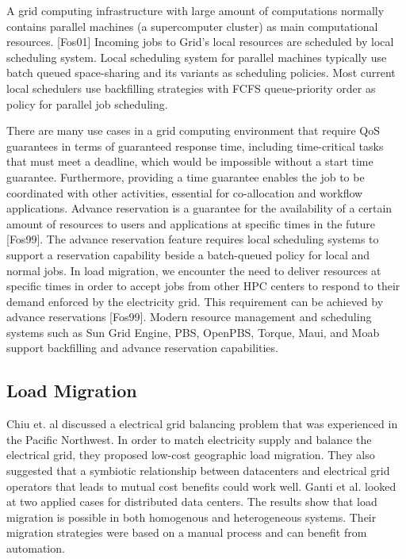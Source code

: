 A grid computing infrastructure with large amount of computations normally
contains parallel machines (a supercomputer cluster) as main computational
resources.  \cite{foster_anatomy_2001} [Fos01]
Incoming jobs to Grid's local resources are scheduled by
local scheduling system. Local scheduling system for parallel machines
typically use batch queued space-sharing and its variants as scheduling
policies. Most current local schedulers use backfilling strategies with FCFS
queue-priority order as policy for parallel job scheduling.

There are many use cases in a grid computing environment that require QoS
guarantees in terms of guaranteed response time, including time-critical
tasks that must meet a deadline, which would be impossible without a start
time guarantee. Furthermore, providing a time guarantee enables the job to be
coordinated with other activities, essential for co-allocation and workflow
applications. Advance reservation is a guarantee for the availability of a
certain amount of resources to users and applications at specific times in
the future 
\cite{foster_distributed_1999} [Fos99]. The advance reservation feature requires local scheduling
systems to support a reservation capability beside a batch-queued policy for
local and normal jobs. In load migration, we encounter the need to deliver
resources at specific times in order to accept jobs from other HPC centers
to respond to their demand enforced by the electricity grid. This requirement
can be achieved by advance reservations 
\cite{foster_distributed_1999}
[Fos99]. Modern resource management
and scheduling systems such as Sun Grid Engine, PBS, OpenPBS, Torque, Maui,
and Moab support backfilling and advance reservation capabilities.

\subsection{Load Migration}
Chiu et. al \cite{chiu_electric_2012} discussed a electrical grid balancing problem that was experienced in the Pacific Northwest. In order to match electricity supply and balance the electrical grid, they proposed low-cost geographic load migration. They also suggested that a symbiotic relationship between datacenters and electrical grid operators that leads to mutual cost benefits could work well.  Ganti et al. \cite{Ghatikar2012b} looked at two applied cases for distributed data centers. The results show that load migration is possible in both homogenous and heterogeneous systems. Their migration strategies were based on a manual process and can benefit from automation.
